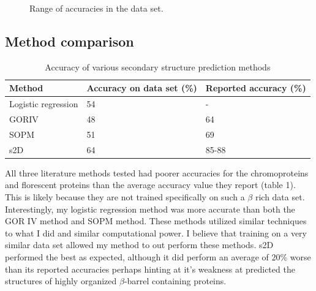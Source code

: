 \documentclass{article}
\begin{document}
\begin{figure}[h]
  \centering
  \caption{Range of accuracies in the data set. }
\end{figure}

\subsection{Method comparison}

\begin{table}[t]
  \caption{Accuracy of various secondary structure prediction methods}
  \centering
  \begin{tabular}{lll}
    \toprule
    Method     & Accuracy on data set (\%)    & Reported accuracy (\%)\\
    \midrule
    Logistic regression & 54 & -     \\
    GORIV     & 48 & 64      \\
    SOPM     & 51      & 69  \\
    s2D     & 64       & 85-88  \\
    \bottomrule
  \end{tabular}
\end{table}


All three literature methods tested had poorer accuracies for the chromoproteins and florescent proteins than the average accuracy value they report (table 1). This is likely because they are not trained specifically on such a $\beta$ rich data set. Interestingly, my logistic regression method was more accurate than both the GOR IV method and SOPM method. These methods utilized similar techniques to what I did and similar computational power. I believe that training on a very similar data set allowed my method to out perform these methods. s2D performed the best as expected, although it did perform an average of 20\% worse than its reported accuracies perhaps hinting at it's weakness at predicted the structures of highly organized $\beta$-barrel containing proteins.
\end{document}
